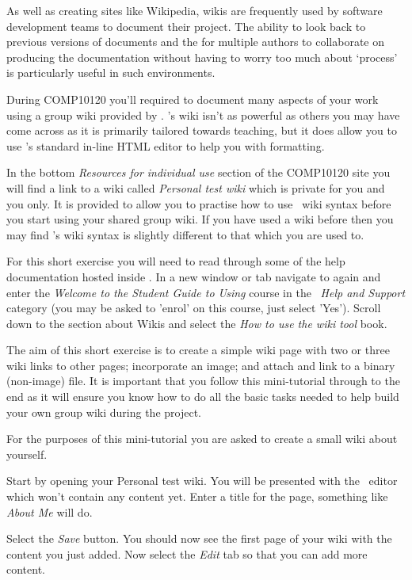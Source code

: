 As well as creating sites like Wikipedia, wikis are frequently used by software development teams to document their project. The ability to look back to previous versions of documents and the for multiple authors to collaborate on producing the documentation without having to worry too much about `process' is particularly useful in such environments.

During COMP10120 you'll required to document many aspects of your work using a group wiki provided by \Moodle. \Moodle's wiki isn't as powerful as others you may have come across as it is primarily tailored towards teaching, but it does allow you to use \Moodle's standard in-line HTML editor to help you with formatting.

In the bottom \emph{Resources for individual use} section of the COMP10120 site you will find a link to a wiki called \emph{Personal test wiki} which is private for you and you only. It is provided to allow you to practise how to use \moodle\ wiki syntax before you start using your shared group wiki. If you have used a wiki before then you may find \Moodle's wiki syntax is slightly different to that which you are used to.

For this short exercise you will need to read through some of the help documentation hosted inside \moodle. In a new window or tab navigate to  again and enter the \emph{ \emph{Welcome to the Student Guide to Using \Moodle} }course in the \moodle\ \emph{Help and Support}  category (you may be asked to 'enrol' on this course, just select 'Yes'). Scroll down to the section about Wikis and select the \emph{How to use the wiki tool} book.

The aim of this short exercise is to create a simple wiki page with two or three wiki links to other pages; incorporate an image; and attach and link to a binary (non-image) file. It is important that you follow this mini-tutorial through to the end as it will ensure you know how to do all the basic tasks needed to help build your own group wiki during the project.

For the purposes of this mini-tutorial you are asked to create a small wiki about yourself.

Start by opening your Personal test wiki. You will be presented with the \moodle\ editor which won't contain any content yet. Enter a title for the page, something like \emph{About Me} will do.

Select the \emph{Save} button. You should now see the first page of your wiki with the content you just added. Now select the \emph{Edit} tab so that you can add more content.

